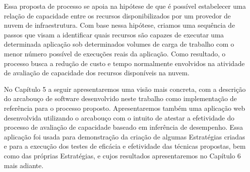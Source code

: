 Essa proposta de processo se apoia na hipótese de que é possível estabelecer uma
relação de capacidade entre os recursos disponibilizados por um provedor de nuvem
de infraestrutura. Com base nessa hipótese, criamos uma sequência de passos que
visam a identificar quais recursos são capazes de executar uma determinada 
aplicação sob determinados volumes de carga de trabalho com o menor número
possível de execuções reais da aplicação. Como resultado, o processo busca
a redução de custo e tempo normalmente envolvidos na atividade de avaliação de
capacidade dos recursos disponíveis na nuvem.

No Capítulo 5 a seguir apresentaremos uma visão mais concreta, com a descrição do 
arcabouço de software desenvolvido neste trabalho como implementação de referência
para o processo proposto. Apresentaremos também uma aplicação
web desenvolvida utilizando o arcabouço com o intuito de atestar a efetividade do processo de avaliação 
de capacidade baseado em inferência de desempenho. Essa aplicação foi usada para
demonstração da criação de algumas Estratégias criadas e para a execução dos 
testes de eficácia e efetividade das técnicas propostas, bem como das próprias
Estratégias, e cujos resultados apresentaremos no Capítulo 6 mais adiante.
   
